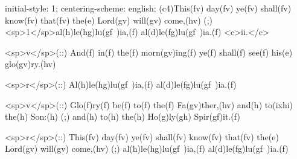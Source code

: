 initial-style: 1;
centering-scheme: english;
(c4)This(fv) day(fv) ye(fv) shall(fv) know(fv) that(fv) the(e) Lord(gv) will(gv) come,(hv) (;) <sp>1</sp>al(h)le(hg)lu(gf~)ia,(f) al(d)le(fg)lu(gf~)ia.(f) <c>ii.</c>

<sp>v</sp>(::) And(f) in(f) the(f) morn(gv)ing(f) ye(f) shall(f) see(f) his(e) glo(gv)ry.(hv)

<sp>r</sp>(::) Al(h)le(hg)lu(gf~)ia,(f) al(d)le(fg)lu(gf~)ia.(f) 

<sp>v</sp>(::) Glo(f)ry(f) be(f) to(f) the(f) Fa(gv)ther,(hv) and(h) to(ixhi) the(h) Son:(h) (;) and(h) to(h) the(h) Ho(g)ly(gh) Spir(gf)it.(f)

<sp>r</sp>(::) This(fv) day(fv) ye(fv) shall(fv) know(fv) that(fv) the(e) Lord(gv) will(gv) come,(hv) (;) al(h)le(hg)lu(gf~)ia,(f) al(d)le(fg)lu(gf~)ia.(f) 